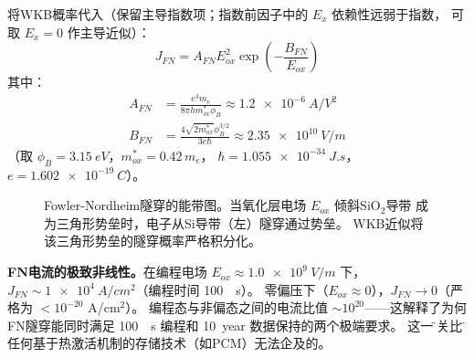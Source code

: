 \documentclass[11pt,a4paper,twoside]{article}
\theoremstyle{definition}
\theoremstyle{plain}
\theoremstyle{remark}
\begin{document}
将WKB概率代入（保留主导指数项；指数前因子中的 $E_x$ 依赖性远弱于指数，
可取 $E_x = 0$ 作主导近似）：
\begin{equation}\label{eq:fn-current}
  \boxed{ J_{FN} = A_{FN} E_{ox}^2
          \exp\!\left( -\frac{B_{FN}}{E_{ox}} \right) }
\end{equation}
其中：
\begin{align}
  A_{FN} &= \frac{e^3 m_e}{8\pi h m^*_{ox} \phi_B}
           \approx \SI{1.2e-6}{A/V^2} \\
  B_{FN} &= \frac{4\sqrt{2 m^*_{ox}} \phi_B^{3/2}}{3 e \hbar}
           \approx \SI{2.35e10}{V/m}
\end{align}
（取 $\phi_B = \SI{3.15}{eV}$，$m^*_{ox} = 0.42\,m_e$，
 $\hbar = \SI{1.055e-34}{J.s}$，$e = \SI{1.602e-19}{C}$）。

\begin{figure}[H]
\centering
{}
\caption{Fowler-Nordheim隧穿的能带图。当氧化层电场 $E_{ox}$ 倾斜SiO$_2$导带
成为三角形势垒时，电子从Si导带（左）隧穿通过势垒。
WKB近似将该三角形势垒的隧穿概率严格积分化。}
\label{fig:fn-barrier}
\end{figure}

\begin{physbox}
  \textbf{FN电流的极致非线性。}在编程电场 $E_{ox} \approx \SI{1.0e9}{V/m}$ 下，
  $J_{FN} \sim \SI{1e4}{A/cm^2}$（编程时间 \SI{100}{\mu s}）。
  零偏压下（$E_{ox} \approx 0$），$J_{FN} \to 0$（严格为 $< 10^{-20}$ A/cm$^2$）。
  编程态与非偏态之间的电流比值 $\sim 10^{20}$——这解释了为何FN隧穿能同时满足
  \SI{100}{\mu s} 编程和 \SI{10}{year} 数据保持的两个极端要求。
  这一\"开关比\"是任何基于热激活机制的存储技术（如PCM）无法企及的。
\end{physbox}
\end{document}
